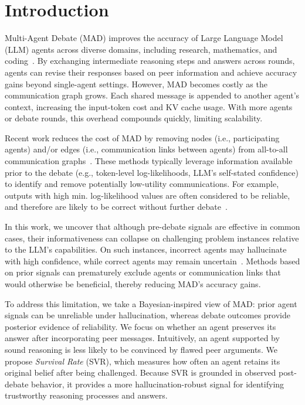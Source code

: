 \section{Introduction}

Multi-Agent Debate (MAD) improves the accuracy of Large Language Model (LLM) agents across diverse domains, including research, mathematics, and coding~\citep{Du2024Improving, Li2023Camel, Wu2024Autogen}. By exchanging intermediate reasoning steps and answers across rounds, agents can revise their responses based on peer information and achieve accuracy gains beyond single-agent settings. However, MAD becomes costly as the communication graph grows. Each shared message is appended to another agent’s context, increasing the input-token cost and KV cache usage. With more agents or debate rounds, this overhead compounds quickly, limiting scalability.

Recent work reduces the cost of MAD by removing nodes (i.e., participating agents) and/or edges (i.e., communication links between agents) from all-to-all communication graphs~\citep{Liu2025Groupdebate, Chen2025Sid, Zeng2025S2Mad, Zhu2026Demystifying}. These methods typically leverage information available prior to the debate (e.g., token-level log-likelihoods, LLM's self-stated confidence) to identify and remove potentially low-utility communications. For example, outputs with high min. log-likelihood values are often considered to be reliable, and therefore are likely to be correct without further debate~\citep{Chen2025Sid}.

In this work, we uncover that although pre-debate signals are effective in common cases, their informativeness can collapse on challenging problem instances relative to the LLM’s capabilities. On such instances, incorrect agents may hallucinate with high confidence, while correct agents may remain uncertain~\citep{Kakai2025Why}. Methods based on prior signals can prematurely exclude agents or communication links that would otherwise be beneficial, thereby reducing MAD's accuracy gains.

To address this limitation, we take a Bayesian-inspired view of MAD: prior agent signals can be unreliable under hallucination, whereas debate outcomes provide posterior evidence of reliability. We focus on whether an agent preserves its answer after incorporating peer messages. Intuitively, an agent supported by sound reasoning is less likely to be convinced by flawed peer arguments. We propose \textit{Survival Rate} (SVR), which measures how often an agent retains its original belief after being challenged. Because SVR is grounded in observed post-debate behavior, it provides a more hallucination-robust signal for identifying trustworthy reasoning processes and answers.


